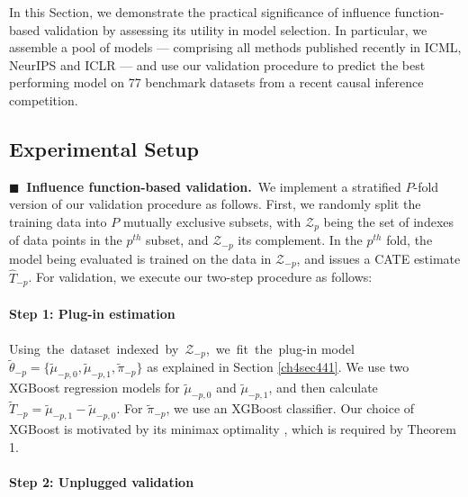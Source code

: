 \documentclass [PhD] {uclathes}
\begin{document}
In this Section, we demonstrate the practical significance of influence function-based validation by assessing its utility in model selection. In particular, we assemble a pool of models --- comprising all methods published recently in ICML, NeurIPS and ICLR --- and use our validation procedure to predict the best performing model on 77 benchmark datasets from a recent causal inference competition.

\subsection{Experimental Setup} 

{\bf \mbox{\tiny $\blacksquare$}\, Influence function-based validation.}\, We implement a stratified \mbox{\footnotesize $P$}-fold version of our validation procedure as follows. First, we randomly split the training data into \mbox{\footnotesize $P$} mutually exclusive subsets, with \mbox{\footnotesize $\mathcal{Z}_p$} being the set of indexes of data points in the \mbox{\footnotesize $p^{th}$} subset, and \mbox{\footnotesize $\mathcal{Z}_{-p}$} its complement. In the \mbox{\footnotesize $p^{th}$} fold, the model being evaluated is trained on the data in \mbox{\footnotesize $\mathcal{Z}_{-p}$}, and issues a CATE estimate \mbox{\footnotesize $\widehat{T}_{-p}$}. For validation, we execute our two-step procedure as follows:\\
\\
\textbf{Step 1: Plug-in estimation}\\
\\
Using~the~dataset~indexed~by~\mbox{\footnotesize $\mathcal{Z}_{-p}$},~we~fit~the~plug-in model \mbox{\footnotesize $\tilde{\theta}_{-p} = \{\tilde{\mu}_{-p,0},\tilde{\mu}_{-p,1},\tilde{\pi}_{-p}\}$} as explained in Section \ref{ch4sec441}. We use two XGBoost regression models for \mbox{\footnotesize $\tilde{\mu}_{-p,0}$} and \mbox{\footnotesize $\tilde{\mu}_{-p,1}$}, and then calculate \mbox{\footnotesize $\widetilde{T}_{-p} = \tilde{\mu}_{-p,1}-\tilde{\mu}_{-p,0}$}. For \mbox{\footnotesize $\tilde{\pi}_{-p}$}, we use an XGBoost classifier. Our choice of XGBoost is motivated by its minimax optimality \cite{linero2018bayesian}, which is required by Theorem 1.\\ 
\\
\textbf{Step 2: Unplugged validation}\\
\\
\end{document}
